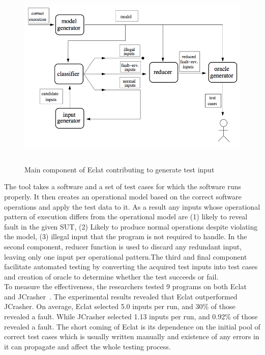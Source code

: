 \begin{figure}[h]
	\centering
	\includegraphics[width=15cm, height=9cm]{Literature/eclat_working.png}
	\caption{Main component of Eclat contributing to generate test input~\cite{Pacheco2005}}
	\label{fig:eclat}
\end{figure}


\noindent The tool takes a software and a set of test cases for which the software runs properly. It then creates an operational model based on the correct software operations and apply the test data to it. As a result any inputs whose operational pattern of execution differs from the operational model are (1) likely to reveal fault in the given SUT, (2) Likely to produce normal operations despite violating the model, (3) illegal input that the program is not required to handle. In the second component, reducer function is used to discard any redundant input, leaving only one input per operational pattern.The third and final component facilitate automated testing by converting the acquired test inputs into test cases and creation of oracle to determine whether the test succeeds or fail. \\
\indent To measure the effectiveness, the researchers tested 9 programs on both Eclat and JCrasher~\cite{Pacheco2007b}.  The experimental results revealed that Eclat outperformed JCrasher. On average, Eclat selected 5.0 inputs per run, and 30\% of those revealed a fault. While JCrasher selected 1.13 inputs per run, and 0.92\% of those revealed a fault. The short coming of Eclat is its dependence on the initial pool of correct test cases which is usually written manually and existence of any errors in it can propagate and affect the whole testing process.    

